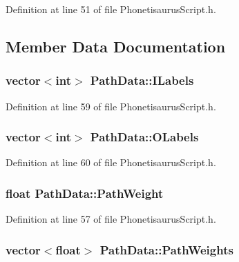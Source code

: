 Definition at line 51 of file Phonetisaurus\+Script.\+h.



\subsection{Member Data Documentation}
\subsubsection[{I\+Labels}]{\setlength{\rightskip}{0pt plus 5cm}vector$<$int$>$ Path\+Data\+::\+I\+Labels}\hypertarget{struct_path_data_a143326b256da0614ac141ab12b90aa1f}{}\label{struct_path_data_a143326b256da0614ac141ab12b90aa1f}


Definition at line 59 of file Phonetisaurus\+Script.\+h.

\subsubsection[{O\+Labels}]{\setlength{\rightskip}{0pt plus 5cm}vector$<$int$>$ Path\+Data\+::\+O\+Labels}\hypertarget{struct_path_data_a910a7d1236c05c6b2a67d6eab58260a7}{}\label{struct_path_data_a910a7d1236c05c6b2a67d6eab58260a7}


Definition at line 60 of file Phonetisaurus\+Script.\+h.

\subsubsection[{Path\+Weight}]{\setlength{\rightskip}{0pt plus 5cm}float Path\+Data\+::\+Path\+Weight}\hypertarget{struct_path_data_af463d789fee9938ef3a00566ed0276c9}{}\label{struct_path_data_af463d789fee9938ef3a00566ed0276c9}


Definition at line 57 of file Phonetisaurus\+Script.\+h.

\subsubsection[{Path\+Weights}]{\setlength{\rightskip}{0pt plus 5cm}vector$<$float$>$ Path\+Data\+::\+Path\+Weights}\hypertarget{struct_path_data_a07ba2ece07b9fcb75cdd31b808185e94}{}\label{struct_path_data_a07ba2ece07b9fcb75cdd31b808185e94}


